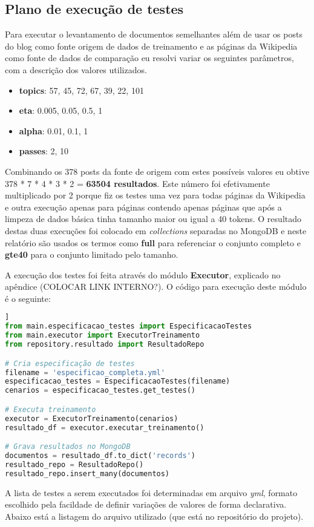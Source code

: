 \subsection{Plano de execução de testes}

Para executar o levantamento de documentos semelhantes além de usar os posts do blog como fonte origem de dados de treinamento e as páginas da 
Wikipedia como fonte de dados de comparação eu resolvi variar os seguintes parâmetros, com a descrição dos valores utilizados.

\begin{itemize}
    \item \textbf{topics}: 57, 45, 72, 67, 39, 22, 101
    \item \textbf{eta}: 0.005, 0.05, 0.5, 1
    \item \textbf{alpha}: 0.01, 0.1, 1
    \item \textbf{passes}: 2, 10
\end{itemize}

Combinando os 378 posts da fonte de origem com estes possíveis valores eu obtive 378 * 7 * 4 * 3 * 2 = \textbf{63504 resultados}. Este número 
foi efetivamente multiplicado por 2 porque fiz os testes uma vez para todas páginas da Wikipedia e outra execução apenas para páginas contendo 
apenas páginas que após a limpeza de dados básica tinha tamanho maior ou igual a 40 tokens. O resultado destas duas execuções foi colocado 
em \textit{collections} separadas no MongoDB e neste relatório são usados os termos como \textbf{full} para referenciar o conjunto completo e 
\textbf{gte40} para o conjunto limitado pelo tamanho.

A execução dos testes foi feita através do módulo \textbf{Executor}, explicado no apêndice (COLOCAR LINK INTERNO?). O código para execução deste 
módulo é o seguinte:

\begin{lstlisting}[language=Python, style=mystyle, frame=lines, caption=Código fonte: Treinamento de modelo usando LDA]]
from main.especificacao_testes import EspecificacaoTestes
from main.executor import ExecutorTreinamento
from repository.resultado import ResultadoRepo

# Cria especificação de testes
filename = 'especificao_completa.yml'
especificacao_testes = EspecificacaoTestes(filename)
cenarios = especificacao_testes.get_testes()

# Executa treinamento
executor = ExecutorTreinamento(cenarios)
resultado_df = executor.executar_treinamento()

# Grava resultados no MongoDB
documentos = resultado_df.to_dict('records')
resultado_repo = ResultadoRepo()
resultado_repo.insert_many(documentos)
\end{lstlisting}

A lista de testes a serem executados foi determinadas em arquivo \textit{yml}, formato escolhido pela facildade de definir variações de valores
de forma declarativa. Abaixo está a listagem do arquivo utilizado (que está no repositório do projeto).

